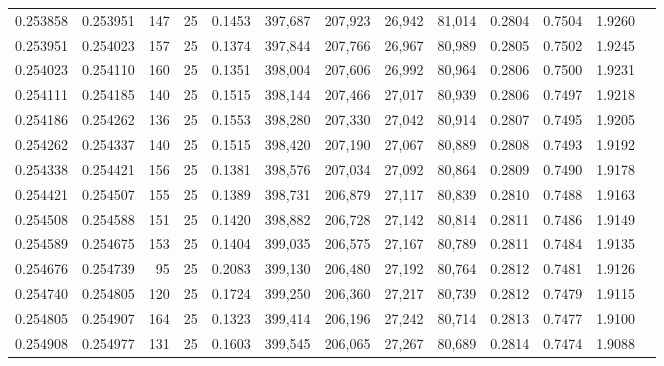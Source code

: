 \begin{tabular}{rrrrrrrrrrrrr}
0.253858 & 0.253951 &   147 &  25 &                                     0.1453 & 397,687 & 207,923 &  26,942 &  81,014 & 0.2804 & 0.7504 & 1.9260 \\
0.253951 & 0.254023 &   157 &  25 &                                     0.1374 & 397,844 & 207,766 &  26,967 &  80,989 & 0.2805 & 0.7502 & 1.9245 \\
0.254023 & 0.254110 &   160 &  25 &                                     0.1351 & 398,004 & 207,606 &  26,992 &  80,964 & 0.2806 & 0.7500 & 1.9231 \\
0.254111 & 0.254185 &   140 &  25 &                                     0.1515 & 398,144 & 207,466 &  27,017 &  80,939 & 0.2806 & 0.7497 & 1.9218 \\
0.254186 & 0.254262 &   136 &  25 &                                     0.1553 & 398,280 & 207,330 &  27,042 &  80,914 & 0.2807 & 0.7495 & 1.9205 \\
0.254262 & 0.254337 &   140 &  25 &                                     0.1515 & 398,420 & 207,190 &  27,067 &  80,889 & 0.2808 & 0.7493 & 1.9192 \\
0.254338 & 0.254421 &   156 &  25 &                                     0.1381 & 398,576 & 207,034 &  27,092 &  80,864 & 0.2809 & 0.7490 & 1.9178 \\
0.254421 & 0.254507 &   155 &  25 &                                     0.1389 & 398,731 & 206,879 &  27,117 &  80,839 & 0.2810 & 0.7488 & 1.9163 \\
0.254508 & 0.254588 &   151 &  25 &                                     0.1420 & 398,882 & 206,728 &  27,142 &  80,814 & 0.2811 & 0.7486 & 1.9149 \\
0.254589 & 0.254675 &   153 &  25 &                                     0.1404 & 399,035 & 206,575 &  27,167 &  80,789 & 0.2811 & 0.7484 & 1.9135 \\
0.254676 & 0.254739 &    95 &  25 &                                     0.2083 & 399,130 & 206,480 &  27,192 &  80,764 & 0.2812 & 0.7481 & 1.9126 \\
0.254740 & 0.254805 &   120 &  25 &                                     0.1724 & 399,250 & 206,360 &  27,217 &  80,739 & 0.2812 & 0.7479 & 1.9115 \\
0.254805 & 0.254907 &   164 &  25 &                                     0.1323 & 399,414 & 206,196 &  27,242 &  80,714 & 0.2813 & 0.7477 & 1.9100 \\
0.254908 & 0.254977 &   131 &  25 &                                     0.1603 & 399,545 & 206,065 &  27,267 &  80,689 & 0.2814 & 0.7474 & 1.9088 \\

\end{tabular}
